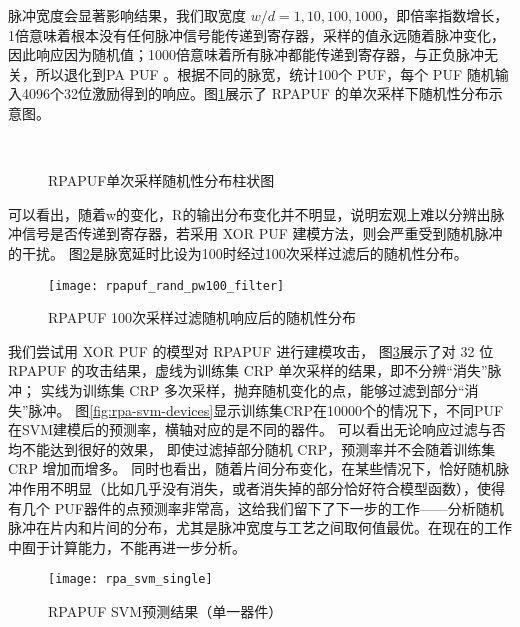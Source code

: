 {脉冲宽度会显著影响结果，我们取宽度 $ w/d={1,10,100,1000} $，即倍率指数增长，1倍意味着根本没有任何脉冲信号能传递到寄存器，采样的值永远随着脉冲变化，因此响应因为随机值；1000倍意味着所有脉冲都能传递到寄存器，与正负脉冲无关，所以退化到PA PUF 。根据不同的脉宽，统计100个 PUF，每个 PUF 随机输入4096个32位激励得到的响应。图\ref{fig:rpa-single-rand}展示了 RPAPUF 的单次采样下随机性分布示意图。

\begin{figure}[htb!]
\centering
{}
\\
\caption{RPAPUF单次采样随机性分布柱状图}
\label{fig:rpa-single-rand}
\end{figure}

可以看出，随着w的变化，R的输出分布变化并不明显，说明宏观上难以分辨出脉冲信号是否传递到寄存器，若采用 XOR PUF 建模方法，则会严重受到随机脉冲的干扰。
图\ref{fig:rpa-k100-rand}是脉宽延时比设为100时经过100次采样过滤后的随机性分布。

\begin{figure}[htb!]
\centering
\texttt{[image: rpapuf\_rand\_pw100\_filter]}
\caption{RPAPUF 100次采样过滤随机响应后的随机性分布}
\label{fig:rpa-k100-rand}
\end{figure}

我们尝试用 XOR PUF 的模型对 RPAPUF 进行建模攻击， 图\ref{fig:rpa-svm}展示了对 32 位 RPAPUF 的攻击结果，虚线为训练集 CRP 单次采样的结果，即不分辨``消失''脉冲；
实线为训练集 CRP 多次采样，抛弃随机变化的点，能够过滤到部分``消失''脉冲。
图\ref{fig:rpa-svm-devices}显示训练集CRP在10000个的情况下，不同PUF在SVM建模后的预测率，横轴对应的是不同的器件。
可以看出无论响应过滤与否均不能达到很好的效果， 即使过滤掉部分随机 CRP，预测率并不会随着训练集 CRP 增加而增多。
同时也看出，随着片间分布变化，在某些情况下，恰好随机脉冲作用不明显（比如几乎没有消失，或者消失掉的部分恰好符合模型函数），使得有几个 PUF器件的点预测率非常高，这给我们留下了下一步的工作——分析随机脉冲在片内和片间的分布，尤其是脉冲宽度与工艺之间取何值最优。在现在的工作中囿于计算能力，不能再进一步分析。

\begin{figure}[htb!]
\centering
\texttt{[image: rpa\_svm\_single]}
\caption{RPAPUF SVM预测结果（单一器件）}
\label{fig:rpa-svm}
\end{figure}

}

